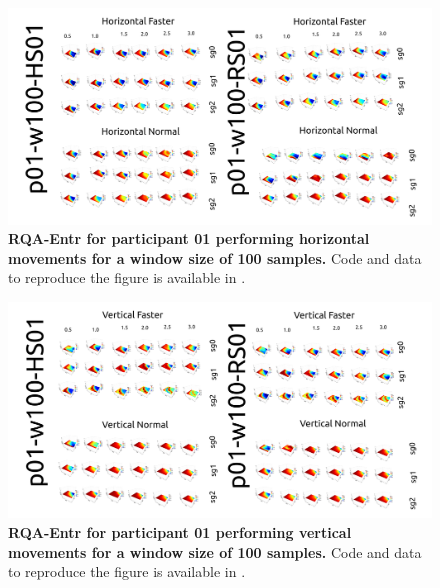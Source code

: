 \documentclass[12pt]{article}
\begin{document}
\newpage
\begin{figure}[ht!]
\centering
\includegraphics[scale=1.0]{figures/rqa/output/epsilons/rqa-epsilonsp01w100Horizontal}
    	\caption{
	{\bf RQA-Entr for participant 01 performing horizontal movements for a window size of 100 samples.}
	Code and data to reproduce the figure is available in \cite{srep2021}.
        }
    \label{fig-p01-H-w100}
\end{figure}
\begin{figure}[hb!]
\centering
\includegraphics[scale=1.0]{figures/rqa/output/epsilons/rqa-epsilonsp01w100Vertical}
    	\caption{
	{\bf RQA-Entr for participant 01 performing vertical movements for a window size of 100 samples.}
	Code and data to reproduce the figure is available in \cite{srep2021}.
        }
    \label{fig-p01-V-w100}
\end{figure}
\end{document}
